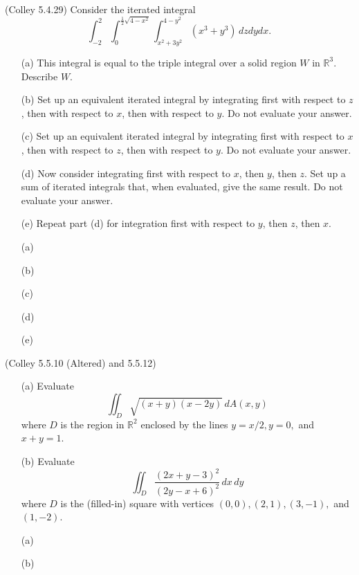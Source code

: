 \documentclass[11pt,letterpaper,cm]{nupset}
\begin{document}
\begin{problem}[Exercise 3] (Colley 5.4.29) Consider the iterated integral
	$$\int_{-2}^2 \int_0^{\frac{1}{2}\sqrt{4-x^2}} \int_{x^2+3y^2}^{4-y^2} (x^3+y^3)\,dzdydx.$$
	\begin{itemize}
		\item[(a)] This integral is equal to the triple integral over a solid region $W$ in $\mathbb{R}^3$. Describe $W$.
		\item[(b)] Set up an equivalent iterated integral by integrating first with respect to $z$, then with respect to $x$, then with respect to $y$. Do not evaluate your answer.
		\item[(c)] Set up an equivalent iterated integral by integrating first with respect to $x$, then with respect to $z$, then with respect to $y$. Do not evaluate your answer.
		\item[(d)] Now consider integrating first with respect to $x$, then $y$, then $z$. Set up a sum of iterated integrals that, when evaluated, give the same result. Do not evaluate your answer.
		\item[(e)] Repeat part (d) for integration first with respect to $y$, then $z$, then $x$.
	\end{itemize}
\end{problem}
\begin{solution}
	\begin{itemize}
		\item[(a)]
		\item[(b)]
		\item[(c)]
		\item[(d)]
		\item[(e)]
	\end{itemize}
\end{solution}
\newpage

\begin{problem}[Exercise 4] (Colley 5.5.10 (Altered) and 5.5.12)
	\begin{itemize}
		\item[(a)] Evaluate
		\[ \iint_D \sqrt{(x+y)(x-2y)}\,dA(x,y)\]
		where $D$ is the region in $\mathbb{R}^2$ enclosed by the lines $y=x/2, y=0,$ and $x+y=1$.  
		\item[(b)] Evaluate
		\[ \iint_D \frac{(2x+y-3)^2}{(2y-x+6)^2}\,dx\,dy \]
		where $D$ is the (filled-in) square with vertices $(0,0), (2,1), (3,-1),$ and $(1,-2)$.
	\end{itemize}
\end{problem}
\begin{solution}
	\begin{itemize}
		\item[(a)]
		\item[(b)]
	\end{itemize}
\end{solution}
\newpage
\end{document}
